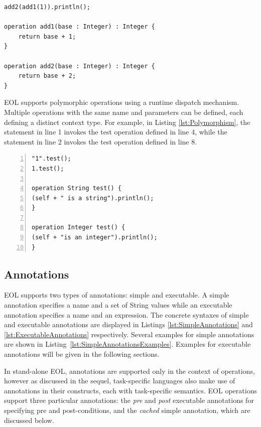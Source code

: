 \begin{lstlisting}[float=h, caption={Context-less EOL operations}, label=lst:OperationsNoContext, language=EOL]
add2(add1(1)).println();

operation add1(base : Integer) : Integer {
	return base + 1;
}

operation add2(base : Integer) : Integer {
	return base + 2;
}
\end{lstlisting}

EOL supports polymorphic operations using a runtime dispatch mechanism. Multiple operations with the same name and parameters can be defined, each defining a distinct context type. For example, in Listing \ref{lst:Polymorphism}, the statement in line 1 invokes the test operation defined in line 4, while the statement in line 2 invokes the test operation defined in line 8.

\begin{lstlisting}[float=h, caption=Demonstration of polymorphism in EOL, label=lst:Polymorphism, numbers=left, language=EOL]
"1".test();
1.test();

operation String test() {
(self + " is a string").println();
}

operation Integer test() {
(self + "is an integer").println();
}
\end{lstlisting}


\subsection{Annotations}
\label{sec:Design.EOL.Annotations}
EOL supports two types of annotations: simple and executable. A simple annotation specifies a name and a set of String values while an executable annotation specifies a name and an expression. The concrete syntaxes of simple and executable annotations are displayed in Listings \ref{lst:SimpleAnnotations} and \ref{lst:ExecutableAnnotations} respectively. Several examples for simple annotations are shown in Listing~\ref{lst:SimpleAnnotationsExamples}. Examples for executable annotations will be given in the following sections.

In stand-alone EOL, annotations are supported only in the context of operations, however as discussed in the sequel, task-specific languages also make use of annotations in their constructs, each with task-specific semantics. EOL operations support three particular annotations: the \emph{pre} and \emph{post} executable annotations for specifying pre and post-conditions, and the \emph{cached} simple annotation, which are discussed below.

